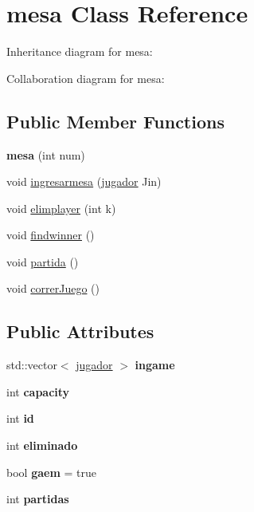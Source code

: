 \hypertarget{classmesa}{}\section{mesa Class Reference}
\label{classmesa}


Inheritance diagram for mesa\+:


Collaboration diagram for mesa\+:
\subsection*{Public Member Functions}
\begin{DoxyCompactItemize}
\item 
{\bfseries mesa} (int num)\hypertarget{classmesa_a69bbe3328c91ab1c8d879242869b1c92}{}\label{classmesa_a69bbe3328c91ab1c8d879242869b1c92}

\item 
void \hyperlink{classmesa_ad43a9ce086745fbc0615cf24c493d102}{ingresarmesa} (\hyperlink{classjugador}{jugador} Jin)
\item 
void \hyperlink{classmesa_a534cd4d5323a56a8524976b9fb93859b}{elimplayer} (int k)
\item 
void \hyperlink{classmesa_a56a722015043f6f45102e48ba3236e18}{findwinner} ()
\item 
void \hyperlink{classmesa_a5d2a4f9b46a8d8b9c1335d3fffaef33c}{partida} ()
\item 
void \hyperlink{classmesa_a895972e154fb043837bf1b0928e0ad52}{correr\+Juego} ()
\end{DoxyCompactItemize}
\subsection*{Public Attributes}
\begin{DoxyCompactItemize}
\item 
std\+::vector$<$ \hyperlink{classjugador}{jugador} $>$ {\bfseries ingame}\hypertarget{classmesa_a01a0fc67fa78ee446eba1ebf6b806b36}{}\label{classmesa_a01a0fc67fa78ee446eba1ebf6b806b36}

\item 
int {\bfseries capacity}\hypertarget{classmesa_a4c31a18478d7d7f3632583fd87f73529}{}\label{classmesa_a4c31a18478d7d7f3632583fd87f73529}

\item 
int {\bfseries id}\hypertarget{classmesa_a69c49bfa36e8807aad720a1274b5a48f}{}\label{classmesa_a69c49bfa36e8807aad720a1274b5a48f}

\item 
int {\bfseries eliminado}\hypertarget{classmesa_a5023be21e8726881c46b374f80ea5c94}{}\label{classmesa_a5023be21e8726881c46b374f80ea5c94}

\item 
bool {\bfseries gaem} = true\hypertarget{classmesa_a8ff15212eae5b4dcc272bc0a1257379f}{}\label{classmesa_a8ff15212eae5b4dcc272bc0a1257379f}

\item 
int {\bfseries partidas}\hypertarget{classmesa_a273bb2a9f9a5ce1f2a9334d2626c2c54}{}\label{classmesa_a273bb2a9f9a5ce1f2a9334d2626c2c54}

\end{DoxyCompactItemize}
